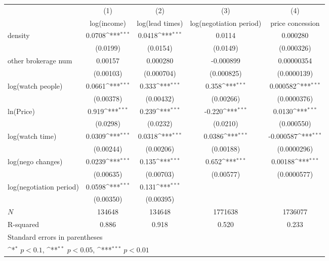 {
\def\sym#1{\ifmmode^{#1}\else\(^{#1}\)\fi}
\begin{tabular}{l*{4}{c}}
\toprule
            &\multicolumn{1}{c}{(1)}&\multicolumn{1}{c}{(2)}&\multicolumn{1}{c}{(3)}&\multicolumn{1}{c}{(4)}\\
            &\multicolumn{1}{c}{log(income)}&\multicolumn{1}{c}{log(lead times)}&\multicolumn{1}{c}{log(negotiation period)}&\multicolumn{1}{c}{price concession}\\
\midrule
density     &      0.0708\sym{***}&      0.0418\sym{***}&      0.0114         &    0.000280         \\
            &    (0.0199)         &    (0.0154)         &    (0.0149)         &  (0.000326)         \\
\addlinespace
other brokerage num  &     0.00157         &    0.000280         &   -0.000899         &  0.00000354         \\
            &   (0.00103)         &  (0.000704)         &  (0.000825)         & (0.0000139)         \\
\addlinespace
log(watch people)&      0.0661\sym{***}&       0.333\sym{***}&       0.358\sym{***}&    0.000582\sym{***}\\
            &   (0.00378)         &   (0.00432)         &   (0.00266)         & (0.0000376)         \\
\addlinespace
ln(Price)&       0.919\sym{***}&       0.239\sym{***}&      -0.220\sym{***}&      0.0130\sym{***}\\
            &    (0.0298)         &    (0.0232)         &    (0.0210)         &  (0.000550)         \\
\addlinespace
log(watch time)&      0.0309\sym{***}&      0.0318\sym{***}&      0.0386\sym{***}&   -0.000587\sym{***}\\
            &   (0.00244)         &   (0.00206)         &   (0.00188)         & (0.0000296)         \\
\addlinespace
log(nego changes)&      0.0239\sym{***}&       0.135\sym{***}&       0.652\sym{***}&     0.00188\sym{***}\\
            &   (0.00635)         &   (0.00703)         &   (0.00577)         & (0.0000577)         \\
\addlinespace
log(negotiation period)&      0.0598\sym{***}&       0.131\sym{***}&                     &                     \\
            &   (0.00350)         &   (0.00395)         &                     &                     \\
\midrule
\(N\)       &      134648         &      134648         &     1771638         &     1736077         \\
R-squared   &       0.886         &       0.918         &       0.520         &       0.233         \\
\bottomrule
\multicolumn{5}{l}{\footnotesize Standard errors in parentheses}\\
\multicolumn{5}{l}{\footnotesize \sym{*} \(p<0.1\), \sym{**} \(p<0.05\), \sym{***} \(p<0.01\)}\\
\end{tabular}
}
